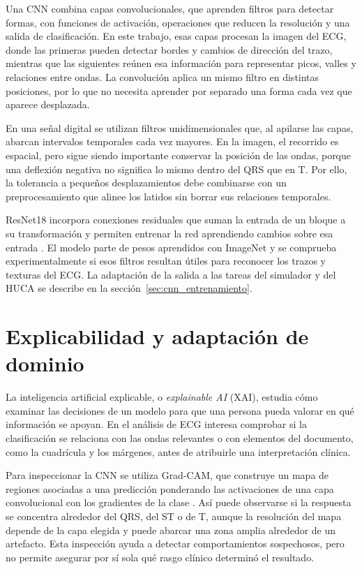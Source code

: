 Una CNN combina capas convolucionales, que aprenden filtros para detectar formas, con funciones de activación, operaciones que reducen la resolución y una salida de clasificación. En este trabajo, esas capas procesan la imagen del ECG, donde las primeras pueden detectar bordes y cambios de dirección del trazo, mientras que las siguientes reúnen esa información para representar picos, valles y relaciones entre ondas. La convolución aplica un mismo filtro en distintas posiciones, por lo que no necesita aprender por separado una forma cada vez que aparece desplazada.

En una señal digital se utilizan filtros unidimensionales que, al apilarse las capas, abarcan intervalos temporales cada vez mayores. En la imagen, el recorrido es espacial, pero sigue siendo importante conservar la posición de las ondas, porque una deflexión negativa no significa lo mismo dentro del QRS que en T. Por ello, la tolerancia a pequeños desplazamientos debe combinarse con un preprocesamiento que alinee los latidos sin borrar sus relaciones temporales.

ResNet18 incorpora conexiones residuales que suman la entrada de un bloque a su transformación y permiten entrenar la red aprendiendo cambios sobre esa entrada \cite{he2016}. El modelo parte de pesos aprendidos con ImageNet y se comprueba experimentalmente si esos filtros resultan útiles para reconocer los trazos y texturas del ECG. La adaptación de la salida a las tareas del simulador y del HUCA se describe en la sección~\ref{sec:cnn_entrenamiento}.

\section{Explicabilidad y adaptación de dominio}
\label{sec:explicabilidad}

La inteligencia artificial explicable, o \textit{explainable AI} (XAI), estudia cómo examinar las decisiones de un modelo para que una persona pueda valorar en qué información se apoyan. En el análisis de ECG interesa comprobar si la clasificación se relaciona con las ondas relevantes o con elementos del documento, como la cuadrícula y los márgenes, antes de atribuirle una interpretación clínica.

Para inspeccionar la CNN se utiliza Grad-CAM, que construye un mapa de regiones asociadas a una predicción ponderando las activaciones de una capa convolucional con los gradientes de la clase \cite{selvaraju2017}. Así puede observarse si la respuesta se concentra alrededor del QRS, del ST o de T, aunque la resolución del mapa depende de la capa elegida y puede abarcar una zona amplia alrededor de un artefacto. Esta inspección ayuda a detectar comportamientos sospechosos, pero no permite asegurar por sí sola qué rasgo clínico determinó el resultado.

